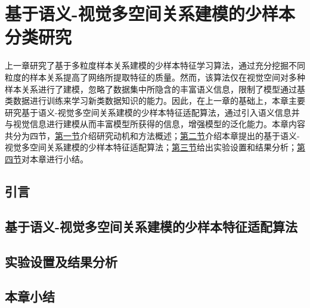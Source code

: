 \chapter[\hspace{0pt}基于语义-视觉多空间关系建模的少样本分类研究]{{\heiti{}\hspace{0pt}基于语义-视觉多空间关系建模的少样本分类研究}}\label{chapter4: 基于语义-视觉多空间关系建模的少样本分类研究}
\removelofgap
\removelotgap

上一章研究了基于多粒度样本关系建模的少样本特征学习算法，通过充分挖掘不同粒度的样本关系提高了网络所提取特征的质量。然而，该算法仅在视觉空间对多种样本关系进行了建模，忽略了数据集中所隐含的丰富语义信息，限制了模型通过基类数据进行训练来学习新类数据知识的能力。因此，在上一章的基础上，本章主要研究基于语义-视觉多空间关系建模的少样本特征适配算法，通过引入语义信息并与视觉信息进行建模从而丰富模型所获得的信息，增强模型的泛化能力。本章内容共分为四节，\hyperref[section4: 引言]{第一节}介绍研究动机和方法概述；\hyperref[section4: 基于语义-视觉多空间关系建模的少样本特征适配算法]{第二节}介绍本章提出的基于语义-视觉多空间关系建模的少样本特征适配算法；\hyperref[section4: 实验设置及结果分析]{第三节}给出实验设置和结果分析；\hyperref[section4: 本章小结]{第四节}对本章进行小结。

\section[\hspace{-2pt}引言]{{\heiti{} \hspace{-8pt}引言}}\label{section4: 引言}

\section[\hspace{-2pt}基于语义-视觉多空间关系建模的少样本特征适配算法]{{\heiti{} \hspace{-8pt}基于语义-视觉多空间关系建模的少样本特征适配算法}}\label{section4: 基于语义-视觉多空间关系建模的少样本特征适配算法}

\section[\hspace{-2pt}实验设置及结果分析]{{\heiti{} \hspace{-8pt}实验设置及结果分析}}\label{section4: 实验设置及结果分析}

\section[\hspace{-2pt}本章小结]{{\heiti{} \hspace{-8pt}本章小结}}\label{section4: 本章小结}

